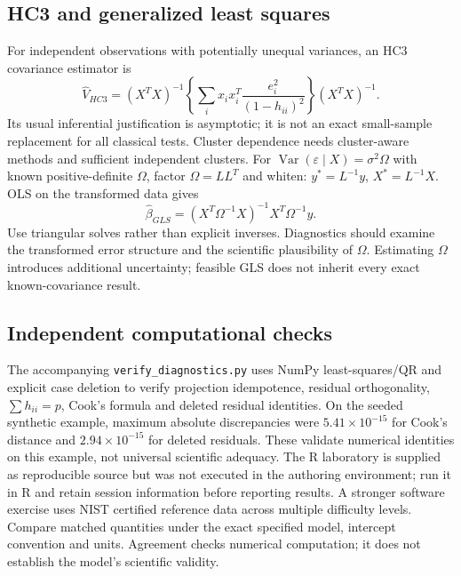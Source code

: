 \documentclass[11pt]{article}
\begin{document}
\subsection{HC3 and generalized least squares}
For independent observations with potentially unequal variances, an HC3 covariance estimator is
\[\widehat V_{HC3}=(X^TX)^{-1}\left\{\sum_i x_ix_i^T\frac{e_i^2}{(1-h_{ii})^2}\right\}(X^TX)^{-1}.\]
Its usual inferential justification is asymptotic; it is not an exact small-sample replacement for all classical tests. Cluster dependence needs cluster-aware methods and sufficient independent clusters.
For $\operatorname{Var}(\varepsilon\mid X)=\sigma^2\Omega$ with known positive-definite $\Omega$, factor $\Omega=LL^T$ and whiten: $y^*=L^{-1}y$, $X^*=L^{-1}X$. OLS on the transformed data gives
\[\widehat\beta_{GLS}=(X^T\Omega^{-1}X)^{-1}X^T\Omega^{-1}y.\]
Use triangular solves rather than explicit inverses. Diagnostics should examine the transformed error structure and the scientific plausibility of $\Omega$. Estimating $\Omega$ introduces additional uncertainty; feasible GLS does not inherit every exact known-covariance result.
\subsection{Independent computational checks}
The accompanying \texttt{verify\_diagnostics.py} uses NumPy least-squares/QR and explicit case deletion to verify projection idempotence, residual orthogonality, $\sum h_{ii}=p$, Cook's formula and deleted residual identities. On the seeded synthetic example, maximum absolute discrepancies were $5.41\times10^{-15}$ for Cook's distance and $2.94\times10^{-15}$ for deleted residuals. These validate numerical identities on this example, not universal scientific adequacy. The R laboratory is supplied as reproducible source but was not executed in the authoring environment; run it in R and retain session information before reporting results.
A stronger software exercise uses NIST certified reference data across multiple difficulty levels. Compare matched quantities under the exact specified model, intercept convention and units. Agreement checks numerical computation; it does not establish the model's scientific validity.
\end{document}
